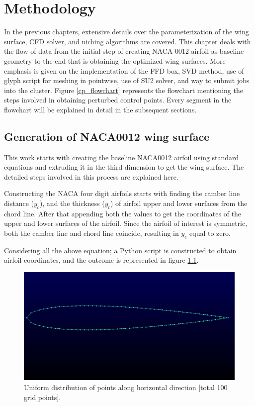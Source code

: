 \chapter{Methodology}
\label{methodology}
In the previous chapters, extensive details over the parameterization of the wing surface, CFD solver, and niching algorithms are covered. This chapter deals with the flow of data from the initial step of creating NACA 0012 airfoil as baseline geometry to the end that is obtaining the optimized wing surfaces. More emphasis is given on the implementation of the FFD box, SVD method, use of glyph script for meshing in pointwise, use of SU2 solver, and way to submit jobs into the cluster. Figure \ref{cp_flowchart} represents the flowchart mentioning the steps involved in obtaining perturbed control points. Every segment in the flowchart will be explained in detail in the subsequent sections.


\section{Generation of NACA0012 wing surface}
This work starts with creating the baseline NACA0012 airfoil using standard equations and extruding it in the third dimension to get the wing surface. The detailed steps involved in this process are explained here.

Constructing the NACA four digit airfoils starts with finding the camber line distance ($y_c$), and the thickness ($y_t$) of airfoil upper and lower surfaces
from the chord line. After that appending both the values to get the coordinates of the upper and lower surfaces of the airfoil. Since the airfoil of interest is symmetric, both the camber line and chord line coincide, resulting in $y_c$ equal to zero.
    



Considering all the above equation; a Python script is constructed to obtain airfoil coordinates, and the outcome is represented in figure \ref{uniform_points_airfoil}.
\begin{figure}[!htbp]
    \centering
    \includegraphics[scale = 0.4]{figures/airfoil_uniform_points.png}
    \caption{Uniform distribution of points along horizontal direction [total 100 grid points].}
    \label{uniform_points_airfoil}
\end{figure}


